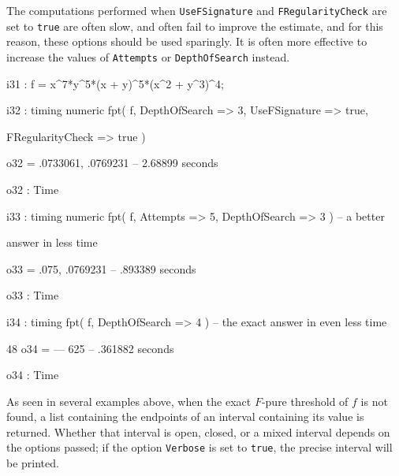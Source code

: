 \documentclass{amsart}
\begin{document}
The computations performed when {\tt UseFSignature} and {\tt FRegularityCheck} are set to {\tt true} are often slow, and often fail to improve the estimate, and for this reason, these options should be used sparingly.
            It is often more effective to increase the values of {\tt Attempts} or {\tt DepthOfSearch} instead.
            
{\small
{}
\begin{MyVerbatim}
            
i31 : f = x^7*y^5*(x + y)^5*(x^2 + y^3)^4;

i32 : timing numeric fpt( f, DepthOfSearch => 3, UseFSignature => true, 

      FRegularityCheck => true )

o32 = {.0733061, .0769231}
      -- 2.68899 seconds

o32 : Time

i33 : timing numeric fpt( f, Attempts => 5, DepthOfSearch => 3 ) -- a better 

      answer in less time

o33 = {.075, .0769231}
      -- .893389 seconds

o33 : Time

i34 : timing fpt( f, DepthOfSearch => 4 ) -- the exact answer in even less 
      time

       48
o34 = ---
      625
      -- .361882 seconds

o34 : Time

\end{MyVerbatim}
}            
            
As seen in several examples above, when the exact  $F$-pure threshold of $f$ is not found, a list containing the endpoints of an interval containing its value is returned.  Whether that interval is open, closed, or a mixed interval depends on the options passed; if the option {\tt Verbose} is set to {\tt true}, the precise interval will be printed.
\end{document}
